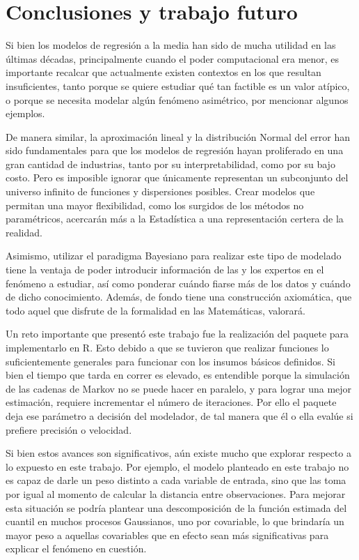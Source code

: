 \chapter[Conclusiones y trabajo futuro]{Conclusiones y trabajo futuro}

Si bien los modelos de regresi\'on a la media han sido de mucha utilidad en las \'ultimas d\'ecadas, principalmente cuando el poder computacional era menor, es importante recalcar que actualmente existen contextos en los que resultan insuficientes, tanto porque se quiere estudiar qu\'e tan factible es un valor at\'ipico, o porque se necesita modelar alg\'un fen\'omeno asim\'etrico, por mencionar algunos ejemplos.

De manera similar, la aproximaci\'on lineal y la distribuci\'on Normal del error han sido fundamentales para que los modelos de regresi\'on hayan proliferado en una gran cantidad de industrias, tanto por su interpretabilidad, como por su bajo costo. Pero es imposible ignorar que \'unicamente representan un subconjunto del universo infinito de funciones y dispersiones posibles. Crear modelos que permitan una mayor flexibilidad, como los surgidos de los m\'etodos no param\'etricos, acercar\'an m\'as a la Estad\'istica a una representaci\'on certera de la realidad.

Asimismo, utilizar el paradigma Bayesiano para realizar este tipo de modelado tiene la ventaja de poder introducir informaci\'on de las y los expertos en el fen\'omeno a estudiar, as\'i como ponderar cu\'ando fiarse m\'as de los datos y cu\'ando de dicho conocimiento. Adem\'as, de fondo tiene una construcci\'on axiom\'atica, que todo aquel que disfrute de la formalidad en las Matem\'aticas, valorar\'a.

Un reto importante que present\'o este trabajo fue la realizaci\'on del paquete para implementarlo en R. Esto debido a que se tuvieron que realizar funciones lo suficientemente generales para funcionar con los insumos b\'asicos definidos. Si bien el tiempo que tarda en correr es elevado, es entendible porque la simulaci\'on de las cadenas de Markov no se puede hacer en paralelo, y para lograr una mejor estimaci\'on, requiere incrementar el n\'umero de iteraciones. Por ello el paquete deja ese par\'ametro a decisi\'on del modelador, de tal manera que \'el o ella eval\'ue si prefiere precisi\'on o velocidad.

Si bien estos avances son significativos, a\'un existe mucho que explorar respecto a lo expuesto en este trabajo. Por ejemplo, el modelo planteado en este trabajo no es capaz de darle un peso distinto a cada variable de entrada, sino que las toma por igual al momento de calcular la distancia entre observaciones. Para mejorar esta situaci\'on se podr\'ia plantear una descomposici\'on de la funci\'on estimada del cuantil en muchos procesos Gaussianos, uno por covariable, lo que brindar\'ia un mayor peso a aquellas covariables que en efecto sean m\'as significativas para explicar el fen\'omeno en cuesti\'on. 

